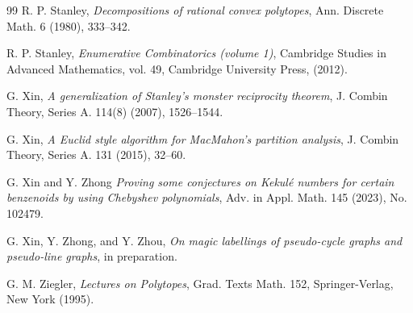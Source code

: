 \documentclass[reqno, 12pt]{amsart}
\theoremstyle{mydefinition}
\theoremstyle{myremark}
\begin{document}
\begin{thebibliography}{99}
 R. P. Stanley, \emph{Decompositions of rational convex polytopes}, Ann. Discrete Math. 6 (1980), 333--342.

 R. P. Stanley, \emph{Enumerative Combinatorics (volume 1)},
    Cambridge Studies in Advanced Mathematics, vol. 49, Cambridge University Press,  (2012).


 G. Xin, \emph{A generalization of Stanley's monster reciprocity theorem}, J. Combin Theory, Series A. 114(8) (2007), 1526--1544.

 G. Xin, \emph{A Euclid style algorithm for MacMahon's partition analysis}, J. Combin Theory, Series A. 131 (2015), 32--60.

 G. Xin and Y. Zhong \emph{Proving some conjectures on Kekul\'e numbers for certain benzenoids by using Chebyshev polynomials}, Adv. in Appl. Math. 145 (2023), No. 102479.

 G. Xin, Y. Zhong, and Y. Zhou, \emph{On magic labellings of pseudo-cycle graphs and pseudo-line graphs}, in preparation.


 G. M. Ziegler, \emph{Lectures on Polytopes}, Grad. Texts Math. 152, Springer-Verlag, New York (1995).

\end{thebibliography}
\end{document}
